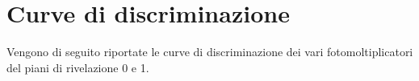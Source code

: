 \appendix
\chapter{Curve di discriminazione}                          %
Vengono di seguito riportate le curve di discriminazione dei vari fotomoltiplicatori del piani di rivelazione 0 e 1.

\begin{figure}[H]
	\centering
		\begin{minipage}{.5\textwidth}
			\centering
			\quad
		\end{minipage}%
		\begin{minipage}{.5\textwidth}
			\centering
			\quad
		\end{minipage}
	\begin{minipage}{.5\textwidth}
		\centering
		\quad

\end{minipage}
\end{figure}
